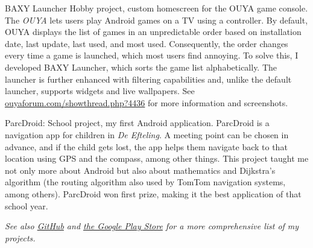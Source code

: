 \documentclass[10pt,a4paper]{article}
\begin{document}
\inlineheadsection
{BAXY Launcher}
{Hobby project, custom homescreen for the OUYA game console. The \emph{OUYA} lets users play Android games on a TV using a controller. By default, OUYA displays the list of games in an unpredictable order based on installation date, last update, last used, and most used. Consequently, the order changes every time a game is launched, which most users find annoying. To solve this, I developed BAXY Launcher, which sorts the game list alphabetically. The launcher is further enhanced with filtering capabilities and, unlike the default launcher, supports widgets and live wallpapers. See \href{http://ouyaforum.com/showthread.php?4436-BAXY-Custom-Launcher}{ouyaforum.com/showthread.php?4436} for more information and screenshots.}


\inlineheadsection
  {ParcDroid:}
  {School project, my first Android application. ParcDroid is a navigation app for children in \emph{De Efteling}. A meeting point can be chosen in advance, and if the child gets lost, the app helps them navigate back to that location using GPS and the compass, among other things. This project taught me not only more about Android but also about mathematics and Dijkstra's algorithm (the routing algorithm also used by TomTom navigation systems, among others). ParcDroid won first prize, making it the best application of that school year.}
  



\vspace{10pt}

\begin{center}
  \emph{See also \href{http://frankkienl.github.com/}{GitHub} and \href{https://play.google.com/store/apps/developer?id=FrankkieNL}{the Google Play Store} for a more comprehensive list of my projects.}
\end{center}
\end{document}
